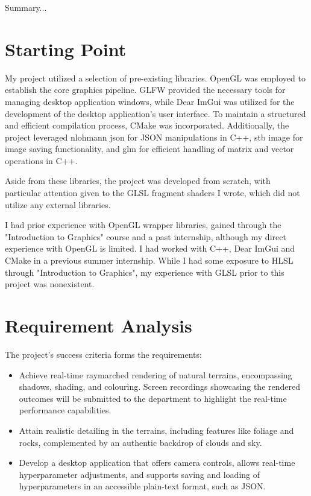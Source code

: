 \label{sec:2}

Summary...

\section{Starting Point}
\label{sec:2.1}

My project utilized a selection of pre-existing libraries. OpenGL was employed to establish the core graphics pipeline. GLFW provided the necessary tools for managing desktop application windows, while Dear ImGui was utilized for the development of the desktop application's user interface. To maintain a structured and efficient compilation process, CMake was incorporated. Additionally, the project leveraged nlohmann json for JSON manipulations in C++, stb image for image saving functionality, and glm for efficient handling of matrix and vector operations in C++.

Aside from these libraries, the project was developed from scratch, with particular attention given to the GLSL fragment shaders I wrote, which did not utilize any external libraries.

I had prior experience with OpenGL wrapper libraries, gained through the "Introduction to Graphics" course and a past internship, although my direct experience with OpenGL is limited. I had worked with C++, Dear ImGui and CMake in a previous summer internship. While I had some exposure to HLSL through "Introduction to Graphics", my experience with GLSL prior to this project was nonexistent.

\section{Requirement Analysis}
\label{sec:2.2}

The project’s success criteria forms the requirements:

\begin{itemize}
    \item Achieve real-time raymarched rendering of natural terrains, encompassing shadows, shading, and colouring. Screen recordings showcasing the rendered outcomes will be submitted to the department to highlight the real-time performance capabilities.
    \item Attain realistic detailing in the terrains, including features like foliage and rocks, complemented by an authentic backdrop of clouds and sky.
    \item Develop a desktop application that offers camera controls, allows real-time hyperparameter adjustments, and supports saving and loading of hyperparameters in an accessible plain-text format, such as JSON.
\end{itemize}


